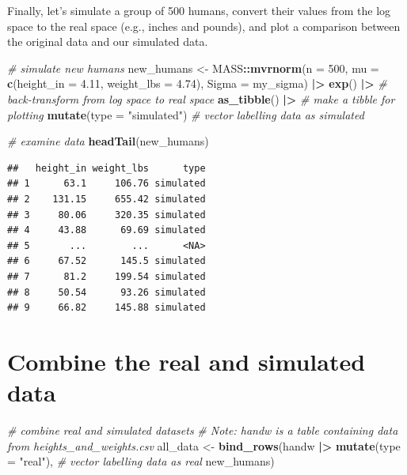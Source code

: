 \documentclass[
]{article}
\newenvironment{Shaded}{\begin{snugshade}}{\end{snugshade}}
\newcommand{\AttributeTok}[1]{\textcolor[rgb]{0.13,0.29,0.53}{#1}}
\newcommand{\CommentTok}[1]{\textcolor[rgb]{0.56,0.35,0.01}{\textit{#1}}}
\newcommand{\DecValTok}[1]{\textcolor[rgb]{0.00,0.00,0.81}{#1}}
\newcommand{\FloatTok}[1]{\textcolor[rgb]{0.00,0.00,0.81}{#1}}
\newcommand{\FunctionTok}[1]{\textcolor[rgb]{0.13,0.29,0.53}{\textbf{#1}}}
\newcommand{\NormalTok}[1]{#1}
\newcommand{\OtherTok}[1]{\textcolor[rgb]{0.56,0.35,0.01}{#1}}
\newcommand{\SpecialCharTok}[1]{\textcolor[rgb]{0.81,0.36,0.00}{\textbf{#1}}}
\newcommand{\StringTok}[1]{\textcolor[rgb]{0.31,0.60,0.02}{#1}}
\begin{document}
Finally, let's simulate a group of 500 humans, convert their values from
the log space to the real space (e.g., inches and pounds), and plot a
comparison between the original data and our simulated data.

\begin{Shaded}
\begin{Highlighting}[]
\CommentTok{\# simulate new humans}
\NormalTok{new\_humans }\OtherTok{\textless{}{-}}
\NormalTok{  MASS}\SpecialCharTok{::}\FunctionTok{mvrnorm}\NormalTok{(}\AttributeTok{n =} \DecValTok{500}\NormalTok{,}
                \AttributeTok{mu =} \FunctionTok{c}\NormalTok{(}\AttributeTok{height\_in =} \FloatTok{4.11}\NormalTok{,}
                       \AttributeTok{weight\_lbs =} \FloatTok{4.74}\NormalTok{),}
                \AttributeTok{Sigma =}\NormalTok{ my\_sigma) }\SpecialCharTok{|\textgreater{}}
  \FunctionTok{exp}\NormalTok{() }\SpecialCharTok{|\textgreater{}}                     \CommentTok{\# back{-}transform from log space to real space}
  \FunctionTok{as\_tibble}\NormalTok{() }\SpecialCharTok{|\textgreater{}}               \CommentTok{\# make a tibble for plotting}
  \FunctionTok{mutate}\NormalTok{(}\AttributeTok{type =} \StringTok{"simulated"}\NormalTok{)    }\CommentTok{\# vector labelling data as simulated}

\CommentTok{\# examine data}
\FunctionTok{headTail}\NormalTok{(new\_humans)}
\end{Highlighting}
\end{Shaded}

\begin{verbatim}
##   height_in weight_lbs      type
## 1      63.1     106.76 simulated
## 2    131.15     655.42 simulated
## 3     80.06     320.35 simulated
## 4     43.88      69.69 simulated
## 5       ...        ...      <NA>
## 6     67.52      145.5 simulated
## 7      81.2     199.54 simulated
## 8     50.54      93.26 simulated
## 9     66.82     145.88 simulated
\end{verbatim}

\hypertarget{combine-the-real-and-simulated-data}{%
\section{Combine the real and simulated
data}\label{combine-the-real-and-simulated-data}}

\begin{Shaded}
\begin{Highlighting}[]
\CommentTok{\# combine real and simulated datasets}
\CommentTok{\# Note: \textasciigrave{}handw\textasciigrave{} is a table containing data from heights\_and\_weights.csv}
\NormalTok{all\_data }\OtherTok{\textless{}{-}}
  \FunctionTok{bind\_rows}\NormalTok{(handw }\SpecialCharTok{|\textgreater{}}                    
              \FunctionTok{mutate}\NormalTok{(}\AttributeTok{type =} \StringTok{"real"}\NormalTok{), }\CommentTok{\# vector labelling data as real}
\NormalTok{              new\_humans)}
\end{Highlighting}
\end{Shaded}
\end{document}
